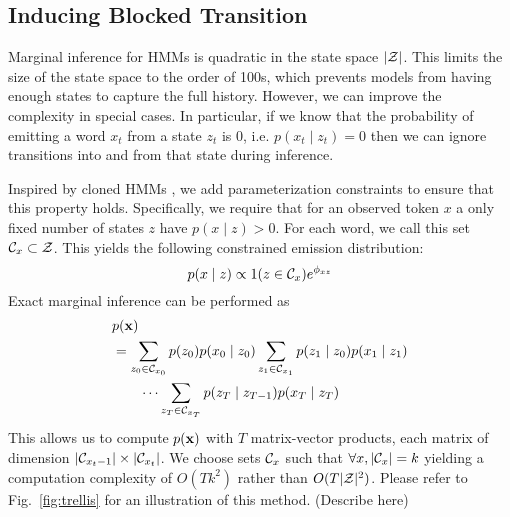 \documentclass[11pt,a4paper]{article}
\begin{document}
\subsection{Inducing Blocked Transition}
Marginal inference for HMMs is quadratic in the  state space $|\mathcal{Z}|$.
This limits the size of the state space to the order of 100s,
which prevents models from having enough states to capture the full history.
However, we can improve the complexity in special cases.
In particular, if we know that the probability of emitting a word $x_t$ from a state $z_t$ is 0,
i.e. $p(x_t \mid z_t) = 0$  then we can ignore transitions into and from that state during inference. 

Inspired by cloned HMMs \citep{dedieu2019learning},
we add parameterization constraints to ensure that this property holds.
Specifically, we require that for an observed token $x$
a only fixed number of states $z$ have $p(x \mid z) > 0$.
For each word, we call this set $\mathcal{C}_x \subset \mathcal{Z}$.
This yields the following constrained emission distribution:
\begin{equation}
\label{eqn:sparse_emission}
p(x \mid z) \propto 1(z \in \mathcal{C}_x)e^{\phi_{xz}}
\end{equation}
Exact marginal inference can be performed as
\begin{equation}
\label{eqn:sparse_marginalization}
\begin{aligned}
&p(\mathbf{x})\\
&= \sum_{z_0 \in \mathcal{C}_{x_0}} p(z_0)p(x_0 \mid z_0)
    \sum_{z_1 \in \mathcal{C}_{x_1}} p(z_1\mid z_0)p(x_1 \mid z_1)\\
    &\qquad\cdots
    \sum_{z_T \in \mathcal{C}_{x_T}} p(z_T \mid z_{T-1})p(x_T \mid z_T)
\end{aligned}
\end{equation}
This allows us to compute $p(\mathbf{x})$ with $T$ matrix-vector products,
each matrix of dimension $|\mathcal{C}_{x_t-1}| \times |\mathcal{C}_{x_{t}}|$.
We choose sets $\mathcal{C}_x$ such that $\forall x, |\mathcal{C}_x| = k$
yielding a computation complexity of $O(Tk^2)$ rather than $O(T|\mathcal{Z}|^2)$.
Please refer to Fig.~\ref{fig:trellis} for an illustration of this method.
(Describe here)
\end{document}
